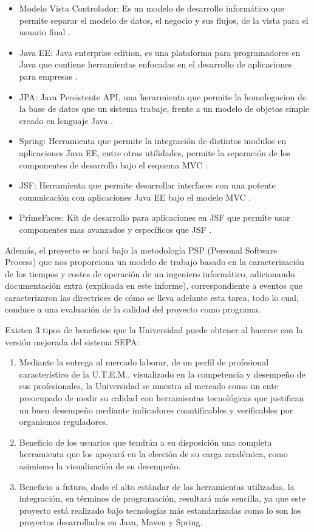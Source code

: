 \documentclass[a4paper,12pt,openany,oneside]{book}
\begin{document}
\begin{itemize}
	\item Modelo Vista Controlador: Es un modelo de desarrollo informático que permite separar el modelo de datos, el negocio y sus flujos, de la vista para el usuario final \cite{data12}.
	\item Java EE: Java enterprise edition, es una plataforma para programadores en Java que contiene herramientas enfocadas en el desarrollo de aplicaciones para empresas \cite{data14}.
	\item JPA: Java Persistente API, una herarmienta que permite la homologacion de la base de datos que un sistema trabaje, frente a un modelo de objetos simple creado en lenguaje Java \cite{data13}.
	\item Spring: Herramienta que permite la integración de distintos modulos en aplicaciones Java EE, entre otras utilidades, permite la separación de los componentes de desarrollo bajo el esquema MVC  \cite{data15}.
	\item JSF: Herramienta que permite desarrollar interfaces con una potente comunicación con aplicaciones Java EE bajo el modelo MVC \cite{data16}.
	\item PrimeFaces: Kit de desarrollo para aplicaciones en JSF que permite usar componentes mas avanzados y específicos que JSF \cite{data17}.
\end{itemize}

Además, el proyecto se hará bajo la metodología PSP (Personal Software Process) que nos proporciona un modelo de trabajo basado en la caracterización de los tiempos y costes de operación de un ingeniero informático, adicionando documentación extra (explicada en este informe), correspondiente a eventos que caracterizaron las directrices de cómo se lleva adelante esta tarea, todo lo cual, conduce a una evaluación de la calidad del proyecto como programa.

Existen 3 tipos de beneficios que la Universidad puede obtener al hacerse con la versión mejorada del sistema SEPA:

\begin{enumerate}
\item Mediante la entrega al mercado laborar, de un perfil de profesional característico de la U.T.E.M., visualizado en la competencia y desempeño de sus profesionales, la Universidad se muestra al mercado como un ente preocupado de medir su calidad con herramientas tecnológicas que justifican un buen desempeño mediante indicadores cuantificables y verificables por 
organismos reguladores.

\item Beneficio de los usuarios que tendrán a su disposición una completa herramienta que los apoyará en la elección de su carga académica, como asimismo la visualización de su desempeño.

\item Beneficio a futuro, dado el alto estándar de las herramientas utilizadas, la integración, en términos de programación, resultará más sencilla, ya que este proyecto está realizado bajo tecnologías más estandarizadas como lo son los proyectos desarrollados en Java, Maven y Spring.
\end{enumerate}
\end{document}
